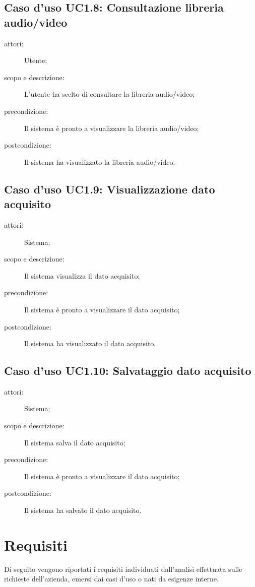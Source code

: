 \subsection{Caso d'uso UC1.8: Consultazione libreria audio/video}
\begin{description}
\item[attori:] Utente;
\item[scopo e descrizione:] L'utente ha scelto di consultare la libreria audio/video;
\item[precondizione:] Il sistema è pronto a visualizzare la libreria audio/video;
\item[postcondizione:] Il sistema ha visualizzato la libreria audio/video.
\end{description}

\subsection{Caso d'uso UC1.9: Visualizzazione dato acquisito}
\begin{description}
\item[attori:] Sistema;
\item[scopo e descrizione:] Il sistema visualizza il dato acquisito;
\item[precondizione:] Il sistema è pronto a visualizzare il dato acquisito;
\item[postcondizione:] Il sistema ha visualizzato il dato acquisito.
\end{description}

\subsection{Caso d'uso UC1.10: Salvataggio dato acquisito}
\begin{description}
\item[attori:] Sistema;
\item[scopo e descrizione:] Il sistema salva il dato acquisito;
\item[precondizione:] Il sistema è pronto a visualizzare il dato acquisito;
\item[postcondizione:] Il sistema ha salvato il dato acquisito.
\end{description}

\section{Requisiti}
Di seguito vengono riportati i requisiti individuati dall'analisi effettuata sulle richieste dell'azienda, emersi dai casi d'uso o nati da esigenze interne.

